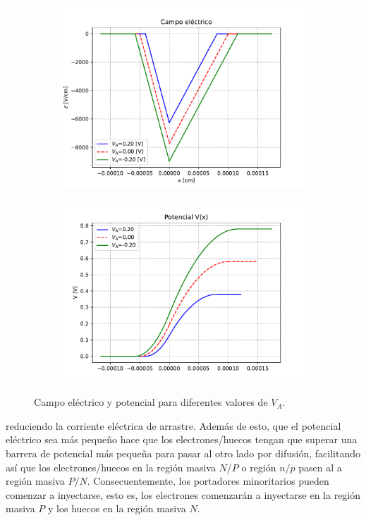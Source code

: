 \begin{figure}[h!]
\centering
\begin{subfigure}{0.47\textwidth}
    \includegraphics[width=\textwidth]{Cuerpo/Ch_03/03_04_E.pdf}
\end{subfigure}
\begin{subfigure}{0.47\textwidth}
    \includegraphics[width=\textwidth]{Cuerpo/Ch_03/03_05_V.pdf}
\end{subfigure}
\caption{Campo eléctrico y potencial para diferentes valores de $V_A$.}
\label{Fig:03_01}
\end{figure}
reduciendo la corriente eléctrica de arrastre. Además de esto, que el potencial eléctrico sea más pequeño hace que los electrones/huecos tengan que superar una barrera de potencial más pequeña para pasar al otro lado por difusión, facilitando así que los electrones/huecos en la región masiva $N$/$P$ o región $n/p$ pasen al a región masiva $P/N$. Consecuentemente, los portadores minoritarios pueden comenzar a inyectarse, esto es, los electrones comenzarán a inyectarse en la región masiva $P$ y los huecos en la región masiva $N$. 

